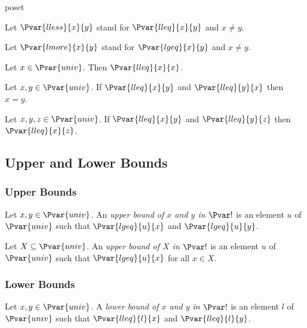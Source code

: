 \documentclass{stex}
\begin{document}
\begin{smodule}{poset}
\begin{forthel}
    Let $\Pvar{lless}{x}{y}$ stand for $\Pvar{lleq}{x}{y}$ and $x\neq y$.

    Let $\Pvar{lmore}{x}{y}$ stand for $\Pvar{lgeq}{x}{y}$ and $x\neq y$.

    \begin{axiom}[Reflexivity]
      Let $x\in\Pvar{univ}$.
      Then $\Pvar{lleq}{x}{x}$.
    \end{axiom}

    \begin{axiom}[Antisymmetry]
      Let $x,y\in\Pvar{univ}$.
      If $\Pvar{lleq}{x}{y}$ and $\Pvar{lleq}{y}{x}$ then $x=y$.
    \end{axiom}

    \begin{axiom}[Transitivity]
      Let $x,y,z\in\Pvar{univ}$.
      If $\Pvar{lleq}{x}{y}$ and $\Pvar{lleq}{y}{z}$ then $\Pvar{lleq}{x}{z}$.
    \end{axiom}
  \end{forthel}

  \subsection{Upper and Lower Bounds}

  \subsubsection{Upper Bounds}

  \begin{forthel}
    \begin{definition}
      Let $x,y\in\Pvar{univ}$.
      An \emph{upper bound of $x$ and $y$ in $\Pvar!$} is an element $u$ of $\Pvar{univ}$ such that $\Pvar{lgeq}{u}{x}$ and $\Pvar{lgeq}{u}{y}$.
    \end{definition}
    
    \begin{definition}
      Let $X\subseteq\Pvar{univ}$.
      An \emph{upper bound of $X$ in $\Pvar!$} is an element $u$ of $\Pvar{univ}$ such that $\Pvar{lgeq}{u}{x}$ for all $x\in X$.
    \end{definition}
  \end{forthel}

  \subsubsection{Lower Bounds}

  \begin{forthel}    
    \begin{definition}
      Let $x,y\in\Pvar{univ}$.
      A \emph{lower bound of $x$ and $y$ in $\Pvar!$} is an element $l$ of $\Pvar{univ}$ such that $\Pvar{lleq}{l}{x}$ and $\Pvar{lleq}{l}{y}$.
    \end{definition}
    

\end{forthel}
\end{smodule}
\end{document}
